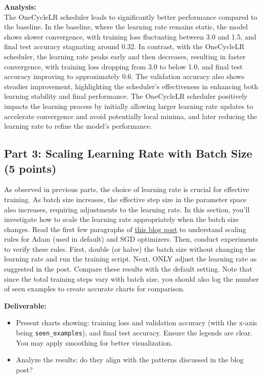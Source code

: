 \documentclass[11pt, oneside]{article}   	%
\begin{document}
\textbf{Analysis: }
\\
The OneCycleLR scheduler leads to significantly better performance compared to the baseline. In the baseline, where the learning rate remains static, the model shows slower convergence, with training loss fluctuating between 3.0 and 1.5, and final test accuracy stagnating around 0.32. In contrast, with the OneCycleLR scheduler, the learning rate peaks early and then decreases, resulting in faster convergence, with training loss dropping from 3.0 to below 1.0, and final test accuracy improving to approximately 0.6. The validation accuracy also shows steadier improvement, highlighting the scheduler's effectiveness in enhancing both learning stability and final performance. The OneCycleLR scheduler positively impacts the learning process by initially allowing larger learning rate updates to accelerate convergence and avoid potentially local minima, and later reducing the learning rate to refine the model’s performance.

\subsection*{Part 3: Scaling Learning Rate with Batch Size (5 points)}

As observed in previous parts, the choice of learning rate is crucial for effective training. As batch size increases, the effective step size in the parameter space also increases, requiring adjustments to the learning rate. In this section, you'll investigate how to scale the learning rate appropriately when the batch size changes. Read the first few paragraphs of \href{https://www.cs.princeton.edu/~smalladi/blog/2024/01/22/SDEs-ScalingRules/}{this blog post} to understand scaling rules for Adam (used in default) and SGD optimizers. Then, conduct experiments to verify these rules. First, double (or halve) the batch size without changing the learning rate and run the training script. Next, ONLY adjust the learning rate as suggested in the post. Compare these results with the default setting. Note that since the total training steps vary with batch size, you should also log the number of seen examples to create accurate charts for comparison.

\noindent\textbf{Deliverable:}
\begin{itemize}
    \item Present charts showing: training loss and validation accuracy (with the x-axis being \texttt{seen\_examples}), and final test accuracy. Ensure the legends are clear. You may apply smoothing for better visualization. 
    \item Analyze the results: do they align with the patterns discussed in the blog post?
\end{itemize}
\end{document}
